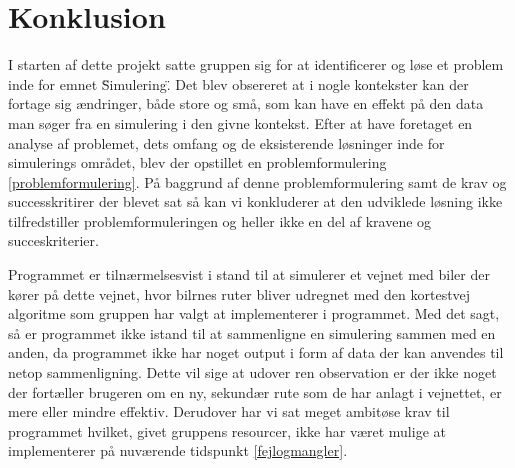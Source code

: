 \chapter{Konklusion}\label{Konklusion}
I starten af dette projekt satte gruppen sig for at identificerer og løse et problem inde for emnet \"Simulering\". Det blev obsereret at i nogle kontekster kan der fortage sig ændringer, både store og små, som kan have en effekt på den data man søger fra en simulering i den givne kontekst. Efter at have foretaget en analyse af problemet, dets omfang og de eksisterende løsninger inde for simulerings området, blev der opstillet en problemformulering \ref{problemformulering}. På baggrund af denne problemformulering samt de krav og successkritirer der blevet sat så kan vi konkluderer at den udviklede løsning ikke tilfredstiller problemformuleringen og heller ikke en del af kravene og succeskriterier.

Programmet er tilnærmelsesvist i stand til at simulerer et vejnet med biler der kører på dette vejnet, hvor bilrnes ruter bliver udregnet med den kortestvej algoritme som gruppen har valgt at implementerer i programmet. Med det sagt, så er programmet ikke istand til at sammenligne en simulering sammen med en anden, da programmet ikke har noget output i form af data der kan anvendes til netop sammenligning. Dette vil sige at udover ren observation er der ikke noget der fortæller brugeren om en ny, sekundær rute som de har anlagt i vejnettet, er mere eller mindre effektiv. Derudover har vi sat meget ambitøse krav til programmet hvilket, givet gruppens resourcer, ikke har været mulige at implementerer på nuværende tidspunkt \ref{fejlogmangler}. 